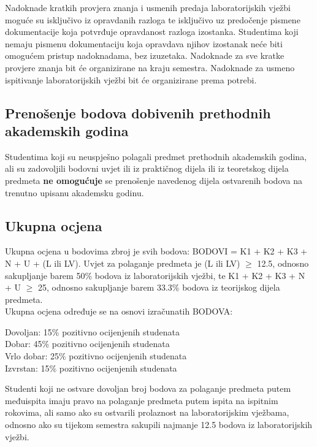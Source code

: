 \documentclass[times, 12pt, utf8]{book}
\newenvironment{myindentpar}[1]%
{\begin{list}{}%
         {\setlength{\leftmargin}{#1}}%
         \item[]%
}
{\end{list}}
\begin{document}
Nadoknade kratkih provjera znanja i usmenih predaja laboratorijskih vježbi moguće su isključivo iz opravdanih razloga te isključivo uz predočenje pismene dokumentacije koja potvrđuje opravdanost razloga izostanka.
Studentima koji nemaju pismenu dokumentaciju koja opravdava njihov izostanak neće biti omogućem pristup nadoknadama, bez izuzetaka.
Nadoknade za sve kratke provjere znanja bit će organizirane na kraju semestra.
Nadoknade za usmeno ispitivanje laboratorijskih vježbi bit će organizirane prema potrebi.

\cleardoublepage  
{}  
{}
\subsection*{Prenošenje bodova dobivenih prethodnih akademskih godina}

Studentima koji su neuspješno polagali predmet prethodnih akademskih godina, ali su zadovoljili bodovni uvjet ili iz praktičnog dijela ili iz teoretskog dijela predmeta \textbf{ne omogućuje} se prenošenje navedenog dijela ostvarenih bodova na trenutno upisanu akademsku godinu.

\cleardoublepage  
{}  
{}
\subsection*{Ukupna ocjena}

Ukupna ocjena u bodovima zbroj je svih bodova: BODOVI = K1 + K2 + K3 + N + U + (L ili LV).
Uvjet za polaganje predmeta je (L ili LV) $\geq$ 12.5, odnosno sakupljanje barem 50\% bodova iz laboratorijskih vježbi, te K1 + K2 + K3 + N + U $\geq$ 25, odnosno sakupljanje barem 33.3\% bodova iz teorijskog dijela predmeta. \\
Ukupna ocjena određuje se na osnovi izračunatih BODOVA:
\begin{myindentpar}{30pt}
Dovoljan: 15\% pozitivno ocijenjenih studenata \\
Dobar: 45\% pozitivno ocijenjenih studenata \\
Vrlo dobar: 25\% pozitivno ocijenjenih studenata \\
Izvrstan: 15\% pozitivno ocijenjenih studenata  
\end{myindentpar}

Studenti koji ne ostvare dovoljan broj bodova za polaganje predmeta putem međuispita imaju pravo na polaganje predmeta putem ispita na ispitnim rokovima, ali samo ako su ostvarili prolaznost na laboratorijskim vježbama, odnosno ako su tijekom semestra sakupili najmanje 12.5 bodova iz laboratorijskih vježbi.
\end{document}
